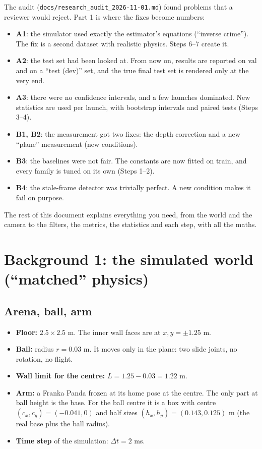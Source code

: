 \documentclass[11pt,a4paper]{article}
\begin{document}
\begin{why}
The audit (\texttt{docs/research\_audit\_2026-11-01.md}) found problems that a reviewer would reject. Part 1 is
where the fixes become numbers:
\begin{itemize}
\item \textbf{A1}: the simulator used exactly the estimator's equations (``inverse crime''). The fix is a second dataset
  with realistic physics. Steps 6--7 create it.
\item \textbf{A2}: the test set had been looked at. From now on, results are reported on val and on a ``test (dev)'' set,
  and the true final test set is rendered only at the very end.
\item \textbf{A3}: there were no confidence intervals, and a few launches dominated. New statistics are used per launch,
  with bootstrap intervals and paired tests (Steps 3--4).
\item \textbf{B1, B2}: the measurement got two fixes: the depth correction and a new ``plane'' measurement (new conditions).
\item \textbf{B3}: the baselines were not fair. The constants are now fitted on train, and every family is tuned on its own
  (Steps 1--2).
\item \textbf{B4}: the stale-frame detector was trivially perfect. A new condition makes it fail on purpose.
\end{itemize}
\end{why}

The rest of this document explains everything you need, from the world and the camera to the filters, the metrics,
the statistics and each step, with all the maths.

\section{Background 1: the simulated world (``matched'' physics)}

\subsection{Arena, ball, arm}
\begin{itemize}
\item \textbf{Floor:} $2.5\times2.5$ m. The inner wall faces are at $x,y=\pm1.25$ m.
\item \textbf{Ball:} radius $r=0.03$ m. It moves only in the plane: two slide joints, no rotation, no flight.
\item \textbf{Wall limit for the centre:} $L = 1.25 - 0.03 = 1.22$ m.
\item \textbf{Arm:} a Franka Panda frozen at its home pose at the centre. The only part at ball height is the base. For the
  ball centre it is a box with centre $(c_x,c_y)=(-0.041,0)$ and half sizes $(h_x,h_y)=(0.143,0.125)$ m (the real base
  plus the ball radius).
\item \textbf{Time step} of the simulation: $\Delta t = 2$ ms.
\end{itemize}
\end{document}
